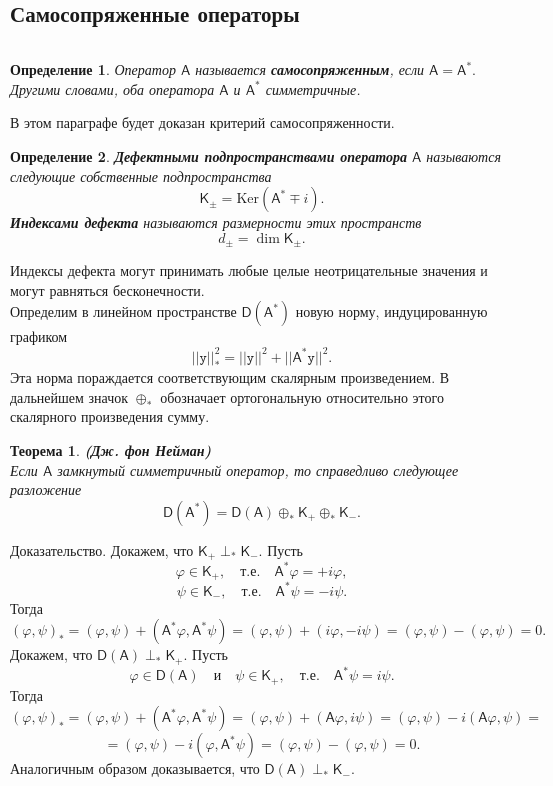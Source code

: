 \documentclass[12pt,a4paper]{article}
\theoremstyle{plain}   \newtheorem{Pro}{Задача}
\newtheorem{Def}{Определение}
\newtheorem{The}{Теорема}
\begin{document}
\subsection{Самосопряженные операторы}
$ \; $
\\
\begin{Def}
Оператор
$ \mathsf{A} $
называется
{\bfseries самосопряженным},
если
$ \mathsf{A}=\mathsf{A}^{\ast} . $
Другими словами, оба оператора
$ \mathsf{A} $
и
$ \mathsf{A}^{\ast} $
симметричные.
\end{Def}
В этом параграфе будет доказан критерий самосопряженности.
\begin{Def}
{\bfseries Дефектными подпространствами оператора}
$ \mathsf{A} $
называются следующие собственные подпространства
$$
  \mathsf{K}_{\pm}= \mathrm{Ker}
  (\mathsf{A}^{\ast} \mp i).
$$
{\bfseries Индексами дефекта}
называются размерности этих пространств
$$
  d_{\pm}=\dim \mathsf{K}_{\pm}.
$$
\end{Def}
Индексы дефекта могут принимать любые целые неотрицательные
значения и могут равняться бесконечности.
\\

Определим в линейном пространстве
$ \mathsf{D}(\mathsf{A}^{\ast}) $
новую норму, индуцированную графиком
$$
  ||\mathtt{y}||_{\ast}^2 =
  ||\mathtt{y}||^2 +
  ||\mathsf{A}^{\ast}\mathtt{y}||^2 .
$$
Эта норма пораждается соответствующим скалярным произведением.
В дальнейшем значок
$ \oplus _{\ast} $
обозначает ортогональную относительно этого скалярного
произведения сумму.
\begin{The}
{\bfseries (Дж. фон Нейман)}
\\
Если
$ \mathsf{A} $
замкнутый симметричный оператор, то справедливо следующее разложение
$$
  \mathsf{D}(\mathsf{A}^{\ast})=
  \mathsf{D}(\mathsf{A}) \oplus _{\ast}
  \mathsf{K}_+ \oplus _{\ast} \mathsf{K}_- .
$$
\end{The}
{\Large Доказательство.}
Докажем, что
$ \mathsf{K}_+ \perp _{\ast} \mathsf{K}_- . $
Пусть
$$
  \varphi \in \mathsf{K}_+ , \quad т.е. \quad
  \mathsf{A}^{\ast} \varphi = +i \varphi ,
$$
$$
  \psi \in \mathsf{K}_- , \quad т.е. \quad
  \mathsf{A}^{\ast} \psi =-i \psi .
$$
Тогда
$$
  (\varphi , \psi )_{\ast}=(\varphi , \psi )+
  (\mathsf{A}^{\ast} \varphi , \mathsf{A}^{\ast} \psi ) =
  (\varphi , \psi ) + (i\varphi , -i \psi )=
  (\varphi , \psi )-(\varphi , \psi) =0.
$$
Докажем, что
$ \mathsf{D}(\mathsf{A}) \perp _{\ast} \mathsf{K}_+ . $
Пусть
$$
  \varphi \in \mathsf{D}(\mathsf{A}) \quad и \quad
  \psi \in \mathsf{K}_+ , \quad т.е. \quad
  \mathsf{A}^{\ast}\psi =i\psi .
$$
Тогда
$$
  (\varphi , \psi )_{\ast}=(\varphi , \psi )+
  (\mathsf{A}^{\ast} \varphi , \mathsf{A}^{\ast} \psi )=
  (\varphi , \psi )+(\mathsf{A}\varphi , i\psi )=
  (\varphi , \psi ) -i (\mathsf{A}\varphi , \psi )=
$$
$$
  =(\varphi , \psi )-i (\varphi , \mathsf{A}^{\ast}\psi )=
  (\varphi , \psi )-(\varphi , \psi)=0.
$$
Аналогичным образом доказывается, что
$ \mathsf{D}(\mathsf{A}) \perp _{\ast} \mathsf{K}_- . $
\\
\end{document}
